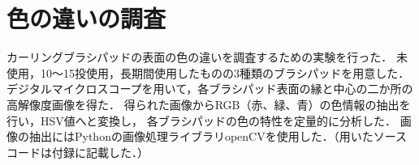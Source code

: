 \documentclass[main]{subfiles}
\begin{document}
\section{色の違いの調査}
カーリングブラシパッドの表面の色の違いを調査するための実験を行った．
未使用，10～15投使用，長期間使用したものの3種類のブラシパッドを用意した．
デジタルマイクロスコープを用いて，各ブラシパッド表面の縁と中心の二か所の高解像度画像を得た．
得られた画像からRGB（赤、緑、青）の色情報の抽出を行い，HSV値へと変換し，
各ブラシパッドの色の特性を定量的に分析した．
画像の抽出にはPythonの画像処理ライブラリopenCVを使用した．（用いたソースコードは付録に記載した．）
\end{document}
